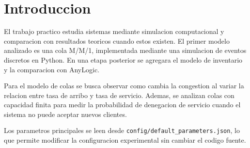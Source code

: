 \section{Introduccion}

El trabajo practico estudia sistemas mediante simulacion computacional y comparacion con resultados teoricos cuando estos existen. El primer modelo analizado es una cola M/M/1, implementada mediante una simulacion de eventos discretos en Python. En una etapa posterior se agregara el modelo de inventario y la comparacion con AnyLogic.

Para el modelo de colas se busca observar como cambia la congestion al variar la relacion entre tasa de arribo y tasa de servicio. Ademas, se analizan colas con capacidad finita para medir la probabilidad de denegacion de servicio cuando el sistema no puede aceptar nuevos clientes.

Los parametros principales se leen desde \texttt{config/default\_parameters.json}, lo que permite modificar la configuracion experimental sin cambiar el codigo fuente.
